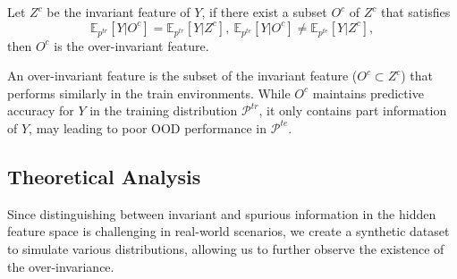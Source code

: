 



\begin{definition} Let $Z^c$ be the invariant feature of $Y$, if there exist a subset $O^c$ of $Z^c$ that satisfies 
\begin{equation}
    \mathbb{E}_{p^{tr}}[Y|O^c]=\mathbb{E}_{p^{tr}}[Y|Z^c],\
    \mathbb{E}_{p^{te}}[Y|O^c]\neq\mathbb{E}_{p^{te}}[Y|Z^c],
\end{equation} 
then $O^c$ is the over-invariant feature.
\end{definition}

An over-invariant feature is the subset of the invariant feature (\( O^c \subset Z^c \)) that performs similarly in the train environments. 
While \( O^c \) maintains predictive accuracy for \( Y \) in the training distribution $\mathcal{P}^{tr}$, it only contains part information of $Y$, may leading to poor OOD performance in $\mathcal{P}^{te}$.


\subsection{Theoretical Analysis}


Since distinguishing between invariant and spurious information in the hidden feature space is challenging in real-world scenarios, we create a synthetic dataset to simulate various distributions, allowing us to further observe the existence of the over-invariance.

